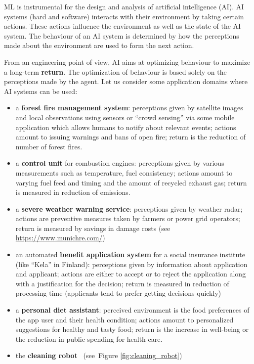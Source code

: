 \documentclass[12pt]{report}
\begin{document}
ML is instrumental for the design and analysis of artificial intelligence (AI). 
AI systems (hard and software) interacts with their environment by 
taking certain actions. These actions influence the environment as 
well as the state of the AI system. The behaviour of an AI system 
is determined by how the perceptions made about the environment 
are used to form the next action. 

From an engineering point of view, AI aims at optimizing behaviour to 
maximize a long-term {\bf return}. The optimization of behaviour is based 
solely on the perceptions made by the agent. Let us consider some 
application domains where AI systems can be used:
\begin{itemize}
\item a {\bf forest fire management system}: perceptions given by 
satellite images and local observations using sensors or ``crowd sensing'' 
via some mobile application which allows humans to notify about 
relevant events; actions amount to issuing warnings and bans of 
open fire; return is the reduction of number of forest fires. 
\item a {\bf control unit} for combustion engines: 
perceptions given by various measurements such as temperature, 
fuel consistency; actions amount to varying fuel feed and timing 
and the amount of recycled exhaust gas; return is measured in 
reduction of emissions.   
\item a {\bf severe weather warning service}: perceptions given by 
weather radar; actions are preventive measures taken by farmers or 
power grid operators; return is measured by savings in damage 
costs (see \url{https://www.munichre.com/})
\item an automated {\bf benefit application system} for a social 
insurance institute (like ``Kela'' in Finland): perceptions given by 
information about application and applicant; actions are either to 
accept or to reject the application along with a justification for the 
decision; return is measured in reduction of processing time 
(applicants tend to prefer getting decisions quickly)
\item  a {\bf personal diet assistant}: perceived environment is the 
food preferences of the app user and their health condition; actions 
amount to personalized suggestions for healthy and tasty food;  
return is the increase in well-being or the reduction in public spending 
for health-care.  
\item the {\bf cleaning robot} \rumba\, (see\ Figure \ref{fig:cleaning_robot}) 

\end{itemize}
\end{document}
